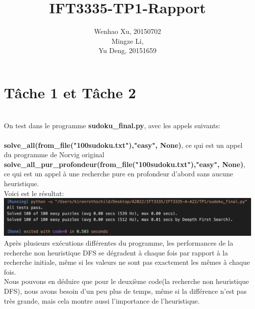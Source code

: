 \documentclass{article}
\title{IFT3335-TP1-Rapport}
\author{Wenhao Xu, 20150702\\
Mingze Li, \\
Yu Deng, 20151659}
\date{}
\begin{document}
\maketitle

\section*{Tâche 1 et Tâche 2}\\
On test dans le programme \textbf{sudoku\_final.py}, avec les appels suivants:\\\\
\textbf{solve\_all(from\_file("100sudoku.txt"),"easy", None)}, ce qui est un appel du programme de Norvig original\\
\textbf{solve\_all\_pur\_profondeur(from\_file("100sudoku.txt"),"easy", None)}, ce qui est un appel à une recherche pure en profondeur d’abord sans aucune heuristique.\\
Voici est le résultat:\\
\includegraphics[width=1\textwidth]{t2.png}\\
Après plusieurs exécutions différentes du programme, les performances de la recherche non heuristique DFS se dégradent à chaque fois par rapport à la recherche initiale, même si les valeurs ne sont pas exactement les mêmes à chaque fois.\\
Nous pouvons en déduire que pour le deuxième code(la recherche non heuristique DFS), nous avons besoin d'un peu plus de temps, même si la différence n'est pas très grande, mais cela montre aussi l'importance de l'heuristique.
\end{document}
